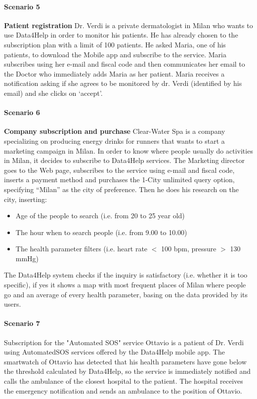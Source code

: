 \paragraph{Scenario 5} \textbf{Patient registration} \newline
Dr. Verdi is a private dermatologist in Milan who wants to use Data4Help in order to monitor his patients. He has already chosen to the  subscription plan with a limit of 100 patients. He asked Maria, one of his patients, to download the Mobile app and subscribe to the service.
Maria subscribes using her e-mail and fiscal code and then communicates her email to the Doctor who immediately adds Maria as her patient. Maria receives a notification asking if she agrees to be monitored by dr. Verdi (identified by his email) and she clicks on ‘accept’.



\paragraph{Scenario 6} \textbf{Company subscription and purchase} \newline
Clear-Water Spa is a company specializing on producing energy drinks for runners that wants to start a marketing campaign in Milan. In order to know where people usually do activities in Milan, it decides to subscribe to Data4Help services. The Marketing director goes to the Web page, subscribes to the service using e-mail and fiscal code, inserts a payment method and purchases the 1-City unlimited query option, specifying “Milan” as the city of preference.
Then he does his research on the city, inserting:
\begin{itemize}
    \item Age of the people to search (i.e. from 20 to 25 year old)
    \item The hour when to search people (i.e. from 9.00 to 10.00)
    \item The health parameter filters (i.e. heart rate $<$ 100 bpm, pressure $>$ 130 mmHg)
\end{itemize}
 The Data4Help system checks if the inquiry is satisfactory (i.e. whether it is too specific), if yes it shows a map with most frequent places of Milan where people go and an average of every health parameter, basing on the data provided by its users. 



\paragraph{Scenario 7}Subscription for the "Automated SOS" service \newline
Ottavio is a patient of Dr. Verdi using AutomatedSOS services offered by the Data4Help mobile app. The smartwatch of Ottavio has detected that his health parameters have gone below the threshold calculated by Data4Help, so the service is immediately notified and calls the ambulance of the closest hospital to the patient. The hospital receives the emergency notification  and sends an ambulance  to the position of Ottavio.


